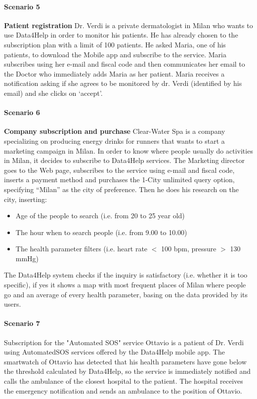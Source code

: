 \paragraph{Scenario 5} \textbf{Patient registration} \newline
Dr. Verdi is a private dermatologist in Milan who wants to use Data4Help in order to monitor his patients. He has already chosen to the  subscription plan with a limit of 100 patients. He asked Maria, one of his patients, to download the Mobile app and subscribe to the service.
Maria subscribes using her e-mail and fiscal code and then communicates her email to the Doctor who immediately adds Maria as her patient. Maria receives a notification asking if she agrees to be monitored by dr. Verdi (identified by his email) and she clicks on ‘accept’.



\paragraph{Scenario 6} \textbf{Company subscription and purchase} \newline
Clear-Water Spa is a company specializing on producing energy drinks for runners that wants to start a marketing campaign in Milan. In order to know where people usually do activities in Milan, it decides to subscribe to Data4Help services. The Marketing director goes to the Web page, subscribes to the service using e-mail and fiscal code, inserts a payment method and purchases the 1-City unlimited query option, specifying “Milan” as the city of preference.
Then he does his research on the city, inserting:
\begin{itemize}
    \item Age of the people to search (i.e. from 20 to 25 year old)
    \item The hour when to search people (i.e. from 9.00 to 10.00)
    \item The health parameter filters (i.e. heart rate $<$ 100 bpm, pressure $>$ 130 mmHg)
\end{itemize}
 The Data4Help system checks if the inquiry is satisfactory (i.e. whether it is too specific), if yes it shows a map with most frequent places of Milan where people go and an average of every health parameter, basing on the data provided by its users. 



\paragraph{Scenario 7}Subscription for the "Automated SOS" service \newline
Ottavio is a patient of Dr. Verdi using AutomatedSOS services offered by the Data4Help mobile app. The smartwatch of Ottavio has detected that his health parameters have gone below the threshold calculated by Data4Help, so the service is immediately notified and calls the ambulance of the closest hospital to the patient. The hospital receives the emergency notification  and sends an ambulance  to the position of Ottavio.


